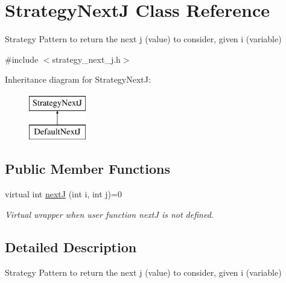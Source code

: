 \hypertarget{classStrategyNextJ}{\section{\-Strategy\-Next\-J \-Class \-Reference}
\label{classStrategyNextJ}
}


\-Strategy \-Pattern to return the next j (value) to consider, given i (variable)  




{\ttfamily \#include $<$strategy\-\_\-next\-\_\-j.\-h$>$}

\-Inheritance diagram for \-Strategy\-Next\-J\-:\begin{figure}[H]
\begin{center}
\leavevmode
\includegraphics[height=2.000000cm]{classStrategyNextJ}
\end{center}
\end{figure}
\subsection*{\-Public \-Member \-Functions}
\begin{DoxyCompactItemize}
\item 
virtual int \hyperlink{classStrategyNextJ_ab566c4e5827240b575d0e7445b7ba695}{next\-J} (int i, int j)=0
\begin{DoxyCompactList}\small\item\em \-Virtual wrapper when user function next\-J is not defined. \end{DoxyCompactList}\end{DoxyCompactItemize}


\subsection{\-Detailed \-Description}
\-Strategy \-Pattern to return the next j (value) to consider, given i (variable) 


